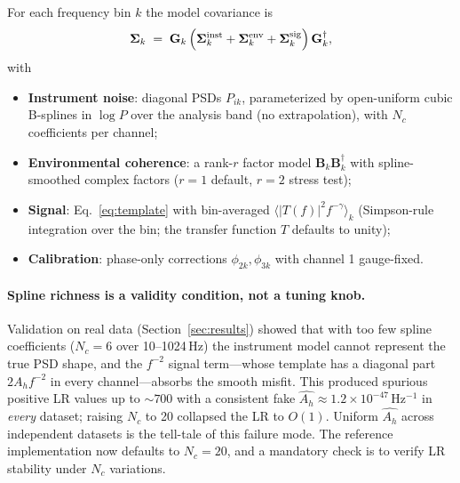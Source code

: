 \documentclass[11pt]{article}
\newcommand{\Ah}{A_h}
\begin{document}
For each frequency bin $k$ the model covariance is
\begin{equation}
\bm{\Sigma}_k \;=\; \mathbf{G}_k \left( \bm{\Sigma}^{\rm inst}_k + \bm{\Sigma}^{\rm env}_k + \bm{\Sigma}^{\rm sig}_k \right) \mathbf{G}_k^\dagger ,
\end{equation}
with
\begin{itemize}
\item \textbf{Instrument noise}: diagonal PSDs $P_{ik}$, parameterized by open-uniform cubic B-splines in $\log P$ over the analysis band (no extrapolation), with $N_c$ coefficients per channel;
\item \textbf{Environmental coherence}: a rank-$r$ factor model $\mathbf{B}_k \mathbf{B}_k^\dagger$ with spline-smoothed complex factors ($r=1$ default, $r=2$ stress test);
\item \textbf{Signal}: Eq.~\eqref{eq:template} with bin-averaged $\langle |T(f)|^2 f^{-\gamma}\rangle_k$ (Simpson-rule integration over the bin; the transfer function $T$ defaults to unity);
\item \textbf{Calibration}: phase-only corrections $\phi_{2k}, \phi_{3k}$ with channel 1 gauge-fixed.
\end{itemize}

\paragraph{Spline richness is a validity condition, not a tuning knob.}
Validation on real data (Section~\ref{sec:results}) showed that with too few spline coefficients ($N_c = 6$ over 10--1024\,Hz) the instrument model cannot represent the true PSD shape, and the $f^{-2}$ signal term---whose template has a diagonal part $2\Ah f^{-2}$ in every channel---absorbs the smooth misfit. This produced spurious positive LR values up to $\sim 700$ with a consistent fake $\hat{\Ah} \approx 1.2\times10^{-47}\,\mathrm{Hz^{-1}}$ in \emph{every} dataset; raising $N_c$ to 20 collapsed the LR to $O(1)$. Uniform $\hat{\Ah}$ across independent datasets is the tell-tale of this failure mode. The reference implementation now defaults to $N_c = 20$, and a mandatory check is to verify LR stability under $N_c$ variations.
\end{document}
